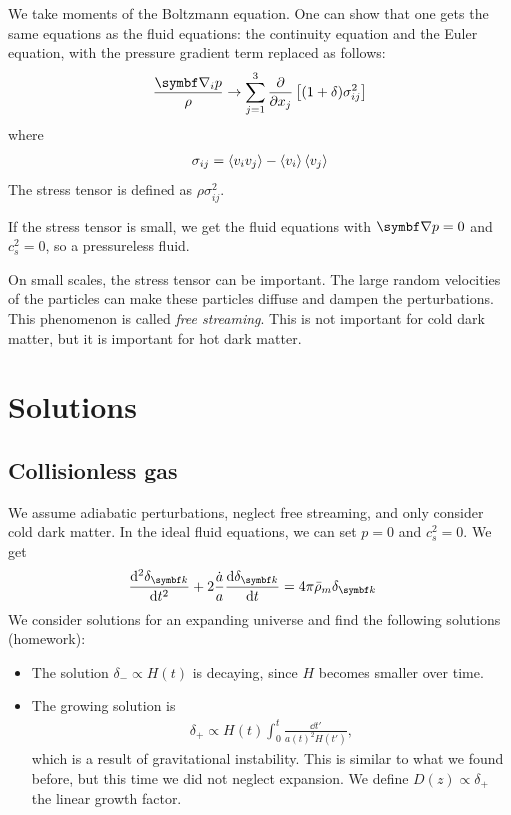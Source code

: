 We take moments of the Boltzmann equation. One can show that one gets the same equations as the fluid equations: the continuity equation and the Euler equation, with the pressure gradient term replaced as follows:
\begin{align*}
	\frac{\Grad_i p}{\rho}
	\to \sum_{j=1}^3 \pdv{}{x_j}
	\left[ (1+\delta) \sigma_{ij}^2 \right]
\end{align*}
where
\begin{align*}
	\sigma_{ij} = \left\langle v_i v_j \right\rangle - \left\langle v_i \right\rangle \left\langle v_j \right\rangle
\end{align*}
The stress tensor is defined as $\rho \sigma_{ij}^2$.

If the stress tensor is small, we get the fluid equations with $\Grad p = 0$ and $c_s^2=0$, so a pressureless fluid.

On small scales, the stress tensor can be important. The large random velocities of the particles can make these particles diffuse and dampen the perturbations. This phenomenon is called \emph{free streaming}. This is not important for cold dark matter, but it is important for hot dark matter.




\section{Solutions}

\subsection{Collisionless gas}
We assume adiabatic perturbations, neglect free streaming, and only consider cold dark matter. In the ideal fluid equations, we can set $p=0$ and $c_s^2 = 0$. We get
\begin{align*}
	\dv[2]{\delta_{\vec{k}}}{t}
	+ 2 \frac{\dot{a}}{a} \dv{\delta_{\vec{k}}}{t}
	&= 4 \pi \bar{\rho}_m \delta_{\vec{k}}
\end{align*}
We consider solutions for an expanding universe and find the following solutions (homework):
\begin{itemize}
	\item The solution $\delta_- \propto H(t)$ is decaying, since $H$ becomes smaller over time.
	\item The growing solution is
	\begin{align*}
		\delta_+ \propto H(t) \int_0^t \frac{\dd{t'}}{a(t)^2 H(t')},
	\end{align*}
	which is a result of gravitational instability. This is similar to what we found before, but this time we did not neglect expansion. We define $D(z) \propto \delta_+$ the linear growth factor.
\end{itemize}

